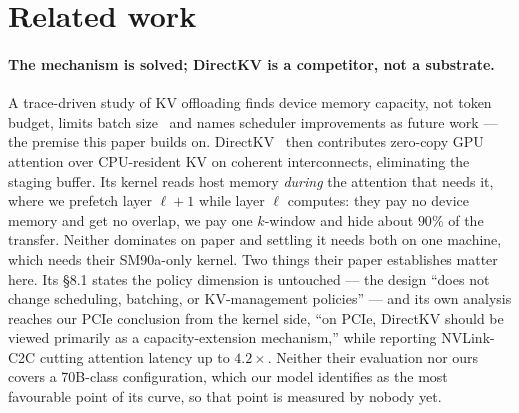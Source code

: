 %
%
\section{Related work}
\label{sec:related}

\paragraph{The mechanism is solved; DirectKV is a competitor, not a substrate.}
A trace-driven study of KV offloading finds device memory capacity, not token
budget, limits batch size~\cite{bottlenecks} and names scheduler improvements as
future work --- the premise this paper builds on.
DirectKV~\cite{directkv} then contributes zero-copy GPU attention over
CPU-resident KV on coherent interconnects, eliminating the staging buffer. Its
kernel reads host memory \emph{during} the attention that needs it, where we
prefetch layer $\ell{+}1$ while layer $\ell$ computes: they pay no device memory
and get no overlap, we pay one $k$-window and hide about $90\%$ of the transfer.
Neither dominates on paper and settling it needs both on one machine, which needs
their SM90a-only kernel. Two things their paper establishes matter here. Its
\S8.1 states the policy dimension is untouched --- the design ``does not change
scheduling, batching, or KV-management policies'' --- and its own analysis reaches
our PCIe conclusion from the kernel side, ``on PCIe, DirectKV should be viewed
primarily as a capacity-extension mechanism,'' while reporting NVLink-C2C cutting
attention latency up to $4.2\times$. Neither their evaluation nor ours covers a
70B-class configuration, which our model identifies as the most favourable point
of its curve, so that point is measured by nobody yet.

